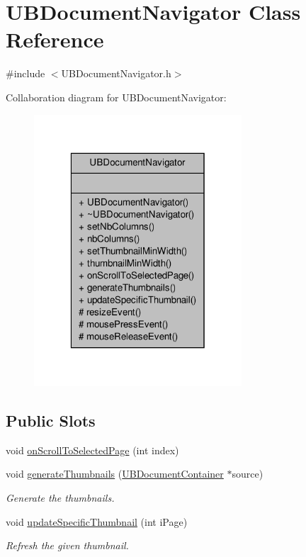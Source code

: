 \hypertarget{class_u_b_document_navigator}{\section{U\-B\-Document\-Navigator Class Reference}
\label{d3/dcc/class_u_b_document_navigator}
}


{\ttfamily \#include $<$U\-B\-Document\-Navigator.\-h$>$}



Collaboration diagram for U\-B\-Document\-Navigator\-:
\nopagebreak
\begin{figure}[H]
\begin{center}
\leavevmode
\includegraphics[width=220pt]{dc/d20/class_u_b_document_navigator__coll__graph}
\end{center}
\end{figure}
\subsection*{Public Slots}
\begin{DoxyCompactItemize}
\item 
void \hyperlink{class_u_b_document_navigator_ade3283bfb61541565207666b47fc2f6d}{on\-Scroll\-To\-Selected\-Page} (int index)
\item 
void \hyperlink{class_u_b_document_navigator_a19e6b14c3fa310dac6714a4b941b588a}{generate\-Thumbnails} (\hyperlink{class_u_b_document_container}{U\-B\-Document\-Container} $\ast$source)
\begin{DoxyCompactList}\small\item\em Generate the thumbnails. \end{DoxyCompactList}\item 
void \hyperlink{class_u_b_document_navigator_a36ae587901fe2d04ae9b8160eba568b3}{update\-Specific\-Thumbnail} (int i\-Page)
\begin{DoxyCompactList}\small\item\em Refresh the given thumbnail. \end{DoxyCompactList}\end{DoxyCompactItemize}
